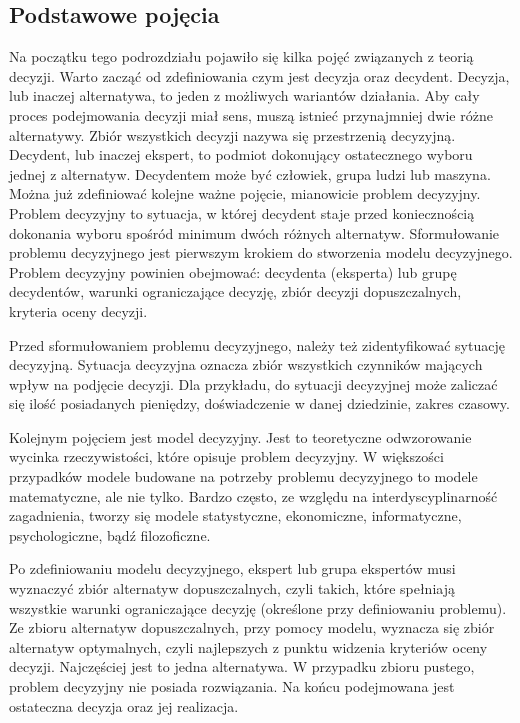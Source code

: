 \subsection{Podstawowe pojęcia}
Na początku tego podrozdziału pojawiło się kilka pojęć związanych z teorią 
decyzji. Warto zacząć od zdefiniowania czym jest decyzja oraz decydent. Decyzja,
lub inaczej alternatywa, to jeden z możliwych wariantów działania. Aby cały 
proces podejmowania decyzji miał sens, muszą istnieć przynajmniej dwie różne 
alternatywy. Zbiór wszystkich decyzji nazywa się przestrzenią decyzyjną. 
Decydent, lub inaczej ekspert, to podmiot dokonujący ostatecznego wyboru jednej 
z alternatyw. Decydentem może być człowiek, grupa ludzi lub maszyna. Można już 
zdefiniować kolejne ważne pojęcie, mianowicie problem decyzyjny. Problem 
decyzyjny to sytuacja, w której decydent staje przed koniecznością dokonania 
wyboru spośród minimum dwóch różnych alternatyw. Sformułowanie problemu 
decyzyjnego jest pierwszym krokiem do stworzenia modelu decyzyjnego. Problem 
decyzyjny powinien obejmować: decydenta (eksperta) lub grupę decydentów, 
warunki ograniczające decyzję, zbiór decyzji dopuszczalnych, kryteria oceny 
decyzji.

Przed sformułowaniem problemu decyzyjnego, należy też zidentyfikować sytuację 
decyzyjną. Sytuacja decyzyjna oznacza zbiór wszystkich czynników mających wpływ 
na podjęcie decyzji. Dla przykładu, do sytuacji decyzyjnej może zaliczać się 
ilość posiadanych pieniędzy, doświadczenie w danej dziedzinie, zakres czasowy.

Kolejnym pojęciem jest model decyzyjny. Jest to teoretyczne odwzorowanie 
wycinka rzeczywistości, które opisuje problem decyzyjny. W większości 
przypadków modele budowane na potrzeby problemu decyzyjnego to modele 
matematyczne, ale nie tylko. Bardzo często, ze względu na interdyscyplinarność 
zagadnienia, tworzy się modele statystyczne, ekonomiczne, informatyczne, 
psychologiczne, bądź filozoficzne.

Po zdefiniowaniu modelu decyzyjnego, ekspert lub grupa ekspertów musi wyznaczyć 
zbiór alternatyw dopuszczalnych, czyli takich, które spełniają wszystkie warunki
ograniczające decyzję (określone przy definiowaniu problemu). Ze zbioru 
alternatyw dopuszczalnych, przy pomocy modelu, wyznacza się zbiór alternatyw 
optymalnych, czyli najlepszych z punktu widzenia kryteriów oceny decyzji.
Najczęściej jest to jedna alternatywa. W przypadku zbioru pustego, problem 
decyzyjny nie posiada rozwiązania. Na końcu podejmowana jest ostateczna decyzja 
oraz jej realizacja.


